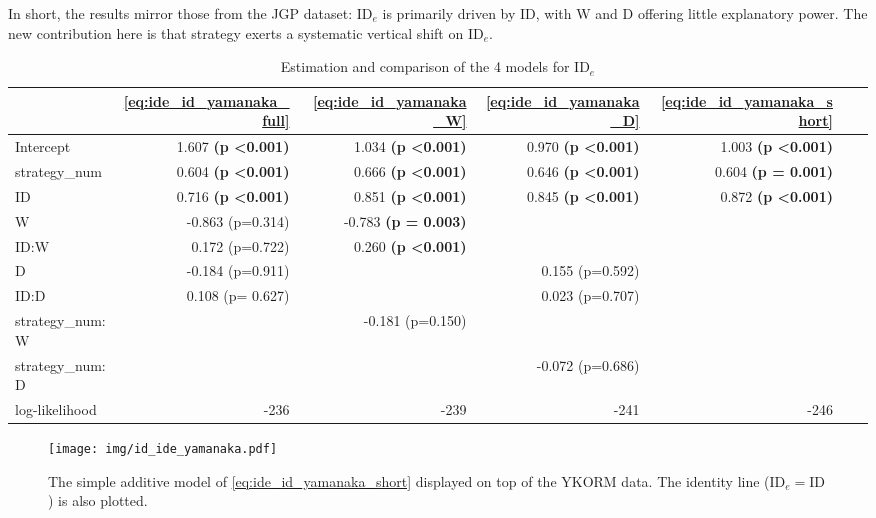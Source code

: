 \documentclass[acmlarge, manuscript,review]{acmart}
\newcommand{\ide}{\ensuremath{{\text{ID}_e}}\xspace}
\begin{document}
In short, the results mirror those from the JGP dataset: \ide is primarily driven by ID, with W and D offering little explanatory power. The new contribution here is that strategy exerts a systematic vertical shift on \ide.



\begin{table}[htbp]
\begin{center}
	\caption{Estimation and comparison of the 4 models for \ide}
	\label{tab:ide_id_yamanaka}
	\begin{tabular}{lrrrrrr}
	\hline
				  &  \autoref{eq:ide_id_yamanaka_full} & \autoref{eq:ide_id_yamanaka_W} &      \autoref{eq:ide_id_yamanaka_D} & \autoref{eq:ide_id_yamanaka_short} \\
	\hline
	Intercept     &  1.607 \textbf{(p \textless 0.001)} &    1.034 \textbf{(p \textless 0.001)} &  0.970 \textbf{(p \textless 0.001)} &  1.003 \textbf{(p \textless 0.001)}\\
	strategy\_num &  0.604 \textbf{(p \textless 0.001)} &    0.666 \textbf{(p \textless 0.001)} & 0.646 \textbf{(p \textless 0.001)} & 0.604 \textbf{(p = 0.001)} \\
	ID            &  0.716  \textbf{(p \textless 0.001)} &    0.851 \textbf{(p \textless 0.001)} & 0.845 \textbf{(p \textless 0.001)}& 0.872 \textbf{(p \textless 0.001)}  \\
	W             & -0.863 (p=0.314) &  -0.783 \textbf{(p = 0.003)}   &  &    \\
	ID:W          &  0.172 (p=0.722) &    0.260 \textbf{(p \textless 0.001)} &    &        \\
	D             & -0.184 (p=0.911)&     & 0.155 (p=0.592) &  \\
	ID:D          &  0.108 (p= 0.627) &     &  0.023 (p=0.707) &    \\
	strategy\_num:W & & -0.181 (p=0.150) & & \\
	strategy\_num:D & &   & -0.072 (p=0.686) & \\
	log-likelihood & -236 & -239 & -241 & -246 \\
	\hline
	\end{tabular}
	\end{center}
\end{table}



\begin{figure}[htbp]
	\centering
	\texttt{[image: img/id\_ide\_yamanaka.pdf]}
	\caption{The simple additive model of \autoref{eq:ide_id_yamanaka_short} displayed on top of the YKORM data. The identity line ($\ide = \text{ID}$) is also plotted.}
	\label{fig:id_ide_yamanaka}
\end{figure}
\end{document}
